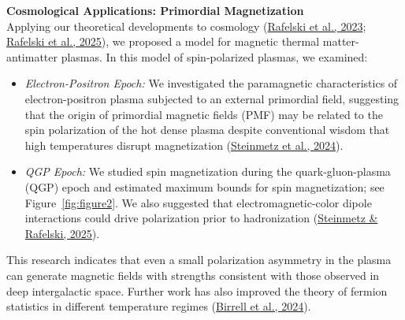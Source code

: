 \documentclass[11pt]{article}
\begin{document}
{\large\textbf{Cosmological Applications: Primordial Magnetization}}\\
Applying our theoretical developments to cosmology (\href{https://doi.org/10.3390/universe9070309}{Rafelski et al., 2023}; \href{https://doi.org/10.48550/arXiv.2409.19031}{Rafelski et al., 2025}), we proposed a model for magnetic thermal matter-antimatter plasmas. In this model of spin-polarized plasmas, we examined:
\begin{itemize}[leftmargin=1.5em,nosep]
    \item \emph{Electron-Positron Epoch:} We investigated the paramagnetic characteristics of electron-positron plasma subjected to an external primordial field, suggesting that the origin of primordial magnetic fields (PMF) may be related to the spin polarization of the hot dense plasma despite conventional wisdom that high temperatures disrupt magnetization (\href{https://doi.org/10.1103/PhysRevD.108.123522}{Steinmetz et al., 2024}).
    \item \emph{QGP Epoch:} We studied spin magnetization during the quark-gluon-plasma (QGP) epoch and estimated maximum bounds for spin magnetization; see Figure~\ref{fig:figure2}. We also suggested that electromagnetic-color dipole interactions could drive polarization prior to hadronization (\href{https://doi.org/10.48550/arXiv.2502.05052}{Steinmetz \& Rafelski, 2025}).
\end{itemize}
This research indicates that even a small polarization asymmetry in the plasma can generate magnetic fields with strengths consistent with those observed in deep intergalactic space. Further work has also improved the theory of fermion statistics in different temperature regimes (\href{https://doi.org/10.1007/s10773-024-05695-8}{Birrell et al., 2024}).
\end{document}

